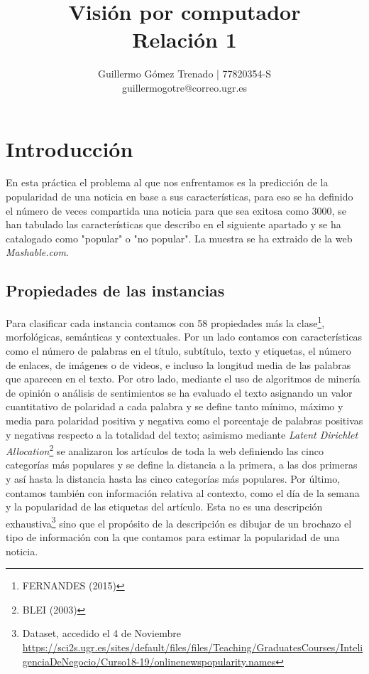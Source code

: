\documentclass{article}
\title{Visión por computador\\
Relación 1}
\author{Guillermo G\'omez Trenado | 77820354-S \\
guillermogotre@correo.ugr.es}
\begin{document}

\maketitle

\tableofcontents

\newpage

\section{Introducción}

En esta práctica el problema al que nos enfrentamos es la predicción de la popularidad de una noticia en base a sus características, para eso se ha definido el número de veces compartida una noticia para que sea exitosa como 3000, se han tabulado las características que describo en el siguiente apartado y se ha catalogado como "popular" o "no popular". La muestra se ha extraido de la web \textit{Mashable.com}. 

\subsection{Propiedades de las instancias}

Para clasificar cada instancia contamos con 58 propiedades más la clase\footnote{FERNANDES (2015)}, morfológicas, semánticas y contextuales. Por un lado contamos con características como el número de palabras en el título, subtítulo, texto y etiquetas, el número de enlaces, de imágenes o de videos, e incluso la longitud media de las palabras que aparecen en el texto. Por otro lado, mediante el uso de algoritmos de minería de opinión o análisis de sentimientos se ha evaluado el texto asignando un valor cuantitativo de polaridad a cada palabra y se define tanto mínimo, máximo y media para polaridad positiva y negativa como el porcentaje de palabras positivas y negativas respecto a la totalidad del texto; asimismo mediante \textit{Latent Dirichlet Allocation}\footnote{BLEI (2003)} se analizaron los artículos de toda la web definiendo las cinco categorías más populares y se define la distancia a la primera, a las dos primeras y así hasta la distancia hasta las cinco categorías más populares. Por último, contamos también con información relativa al contexto, como el día de la semana y la popularidad de las etiquetas del artículo. Esta no es una descripción exhaustiva\footnote{Dataset, accedido el 4 de Noviembre \url{https://sci2s.ugr.es/sites/default/files/files/Teaching/GraduatesCourses/InteligenciaDeNegocio/Curso18-19/onlinenewspopularity.names}} sino que el propósito de la descripción es dibujar de un brochazo el tipo de información con la que contamos para estimar la popularidad de una noticia.
\end{document}
